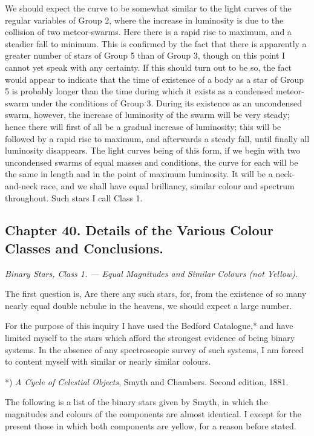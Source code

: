 \documentclass[a4paper, 12pt, oneside, polutonikogreek, english]{article}
\begin{document}
We should expect the curve to be somewhat similar to the light curves of the regular variables of Group 2, where the increase in luminosity is due to the collision of two meteor-swarms. Here there is a rapid rise to maximum, and a steadier fall to minimum. This is confirmed by the fact that there is apparently a greater number of stars of Group 5 than of Group 3, though on this point I cannot yet speak with any certainty. If this should turn out to be so, the fact would appear to indicate that the time of existence of a body as a star of Group 5 is probably longer than the time during which it exists as a condensed meteor-swarm under the conditions of Group 3. During its existence as an uncondensed swarm, however, the increase of luminosity of the swarm will be very steady; hence there will first of all be a gradual increase of luminosity; this will be followed by a rapid rise to maximum, and afterwards a steady fall, until finally all luminosity disappears. The light curves being of this form, if we begin with two uncondensed swarms of equal masses and conditions, the curve for each will be the same in length and in the point of maximum luminosity. It will be a neck-and-neck race, and we shall have equal brilliancy, similar colour and spectrum throughout. Such stars I call Class 1.

\subsection{Chapter 40. Details of the Various Colour Classes and Conclusions.}

\emph{Binary Stars, Class 1. --- Equal Magnitudes and Similar Colours (not Yellow).}

The first question is, Are there any such stars, for, from the existence of so many nearly equal double nebulæ in the heavens, we should expect a large number.

For the purpose of this inquiry I have used the Bedford Catalogue,* and have limited myself to the stars which afford the strongest evidence of being binary systems. In the absence of any spectroscopic survey of such systems, I am forced to content myself with similar or nearly similar colours.

*) \emph{A Cycle of Celestial Objects}, Smyth and Chambers. Second edition, 1881.

The following is a list of the binary stars given by Smyth, in which the magnitudes and colours of the components are almost identical. I except for the present those in which both components are yellow, for a reason before stated.
\end{document}
